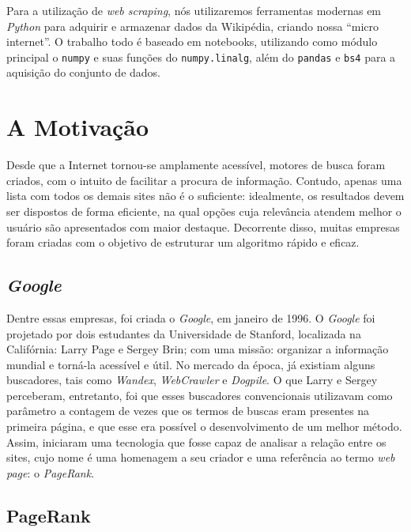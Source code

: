 \documentclass[11pt]{article}
\begin{document}
Para a utilização de \emph{web scraping}, nós utilizaremos ferramentas
modernas em \emph{Python} para adquirir e armazenar dados da Wikipédia,
criando nossa ``micro internet''. O trabalho todo é baseado em
notebooks, utilizando como módulo principal o \texttt{numpy} e suas
funções do \texttt{numpy.linalg}, além do \texttt{pandas} e \texttt{bs4}
para a aquisição do conjunto de dados.


    \hypertarget{a-motivauxe7uxe3o}{%
\section{A Motivação}\label{a-motivauxe7uxe3o}}

Desde que a Internet tornou-se amplamente acessível, motores de busca
foram criados, com o intuito de facilitar a procura de informação.
Contudo, apenas uma lista com todos os demais sites não é o suficiente:
idealmente, os resultados devem ser dispostos de forma eficiente, na
qual opções cuja relevância atendem melhor o usuário são apresentados
com maior destaque. Decorrente disso, muitas empresas foram criadas com
o objetivo de estruturar um algoritmo rápido e eficaz.

    \hypertarget{google}{%
\subsection{\texorpdfstring{\emph{Google}}{Google}}\label{google}}

Dentre essas empresas, foi criada o \emph{Google}, em janeiro de 1996. O
\emph{Google} foi projetado por dois estudantes da Universidade de
Stanford, localizada na Califórnia: Larry Page e Sergey Brin; com uma
missão: organizar a informação mundial e torná-la acessível e útil. No
mercado da época, já existiam alguns buscadores, tais como
\emph{Wandex}, \emph{WebCrawler} e \emph{Dogpile}. O que Larry e Sergey
perceberam, entretanto, foi que esses buscadores convencionais
utilizavam como parâmetro a contagem de vezes que os termos de buscas
eram presentes na primeira página, e que esse era possível o
desenvolvimento de um melhor método. Assim, iniciaram uma tecnologia que
fosse capaz de analisar a relação entre os sites, cujo nome é uma
homenagem a seu criador e uma referência ao termo \textit{web page}: o \emph{PageRank}.

    \hypertarget{pagerank}{%
\subsection{PageRank}\label{pagerank}}
\end{document}
